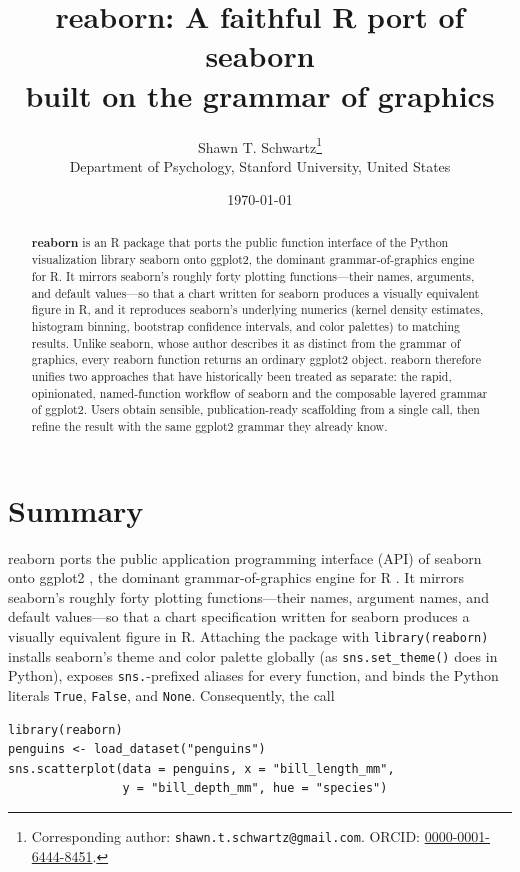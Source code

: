 \documentclass[11pt]{article}
\title{\textbf{reaborn}: A faithful R port of seaborn\\ built on the grammar of graphics}
\author{
  Shawn T. Schwartz\thanks{Corresponding author: \texttt{shawn.t.schwartz@gmail.com}.
  ORCID: \href{https://orcid.org/0000-0001-6444-8451}{0000-0001-6444-8451}.}\\
  \small Department of Psychology, Stanford University, United States%
}
\date{\today}
\begin{document}
\maketitle

\begin{abstract}
\noindent
\textbf{reaborn} is an R package that ports the public function interface of the
Python visualization library seaborn onto ggplot2, the dominant grammar-of-graphics
engine for R. It mirrors seaborn's roughly forty plotting functions---their names,
arguments, and default values---so that a chart written for seaborn produces a
visually equivalent figure in R, and it reproduces seaborn's underlying numerics
(kernel density estimates, histogram binning, bootstrap confidence intervals, and
color palettes) to matching results. Unlike seaborn, whose author describes it as
distinct from the grammar of graphics, every reaborn function returns an ordinary
ggplot2 object. reaborn therefore unifies two approaches that have historically been
treated as separate: the rapid, opinionated, named-function workflow of seaborn and
the composable layered grammar of ggplot2. Users obtain sensible, publication-ready
scaffolding from a single call, then refine the result with the same ggplot2 grammar
they already know.
\end{abstract}

\section{Summary}

reaborn ports the public application programming interface (API) of seaborn
\citep{waskom2021seaborn} onto ggplot2 \citep{wickham2016ggplot2}, the dominant
grammar-of-graphics engine for R \citep{rcoreteam2025}. It mirrors seaborn's roughly
forty plotting functions---their names, argument names, and default values---so that
a chart specification written for seaborn produces a visually equivalent figure in R.
Attaching the package with \texttt{library(reaborn)} installs seaborn's theme and
color palette globally (as \texttt{sns.set\_theme()} does in Python), exposes
\texttt{sns.}-prefixed aliases for every function, and binds the Python literals
\texttt{True}, \texttt{False}, and \texttt{None}. Consequently, the call

\begin{lstlisting}
library(reaborn)
penguins <- load_dataset("penguins")
sns.scatterplot(data = penguins, x = "bill_length_mm",
                y = "bill_depth_mm", hue = "species")
\end{lstlisting}
\end{document}
